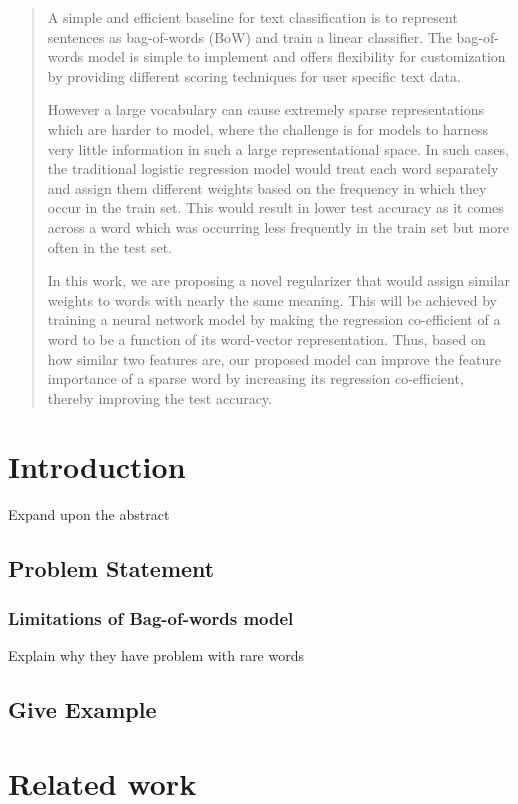 \begin{abstract}
A simple and efficient baseline for text classification is to represent sentences as bag-of-words (BoW) and train a linear classifier. The bag-of-words model is simple to implement and offers flexibility for customization by providing different scoring techniques for user specific text data. 


However a large vocabulary can cause extremely sparse representations which are harder to model, where the challenge is for models to harness very little information in such a large representational space. In such cases, the traditional logistic regression model would treat each word separately and assign them different weights based on the frequency in which they occur in the train set. This would result in lower test accuracy as it comes across a word which was occurring less frequently in the train set but more often in the test set. 


In this work, we are proposing a novel regularizer that would assign similar weights to words with nearly the same meaning. This will be achieved by training a neural network model by making the regression co-efficient of a word to be a function of its word-vector representation. Thus, based on how similar two features are, our proposed model can improve the feature importance of a sparse word by increasing its regression co-efficient, thereby improving the test accuracy.

\end{abstract}

\chapter{Introduction}

Expand upon the abstract

\section{Problem Statement}
\subsection{Limitations of Bag-of-words model}
Explain why they have problem with rare words

\section{Give Example}

\chapter{Related work}

